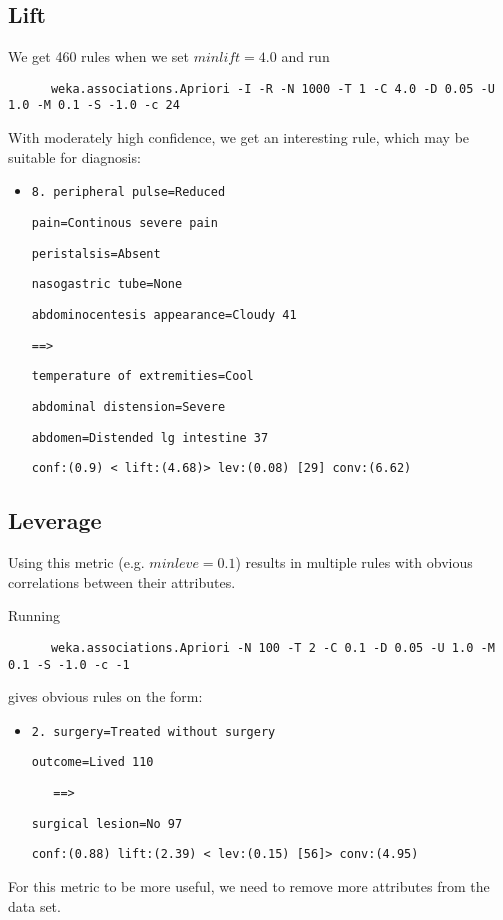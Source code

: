 \subsection{Lift}
We get 460 rules when we set $minlift = 4.0$ and run
\begin{verbatim}
	  weka.associations.Apriori -I -R -N 1000 -T 1 -C 4.0 -D 0.05 -U 1.0 -M 0.1 -S -1.0 -c 24
\end{verbatim}
With moderately high confidence, we get an interesting rule, which may be suitable for diagnosis:
\begin{itemize}
\item   \verb|8. peripheral pulse=Reduced|

\verb|pain=Continous severe pain| 

\verb|peristalsis=Absent| 

\verb|nasogastric tube=None| 

\verb|abdominocentesis appearance=Cloudy 41 |


\verb|==>| 


\verb|temperature of extremities=Cool| 

\verb|abdominal distension=Severe |

\verb|abdomen=Distended lg intestine 37 | 
  
\verb|conf:(0.9) < lift:(4.68)> lev:(0.08) [29] conv:(6.62)|

\end{itemize}



\subsection{Leverage} \label{sec: leve}
Using this metric (e.g. $minleve = 0.1$) results in multiple rules with obvious correlations between their attributes.

\noindent
Running
\begin{verbatim}
	  weka.associations.Apriori -N 100 -T 2 -C 0.1 -D 0.05 -U 1.0 -M 0.1 -S -1.0 -c -1
\end{verbatim} 

\noindent
gives obvious rules on the form:
\begin{itemize}
\item \verb|2. surgery=Treated without surgery| 

\verb|outcome=Lived 110|


\verb|   ==>|
 
\verb|surgical lesion=No 97|

\verb|conf:(0.88) lift:(2.39) < lev:(0.15) [56]> conv:(4.95)|
\end{itemize}
For this metric to be more useful, we need to remove more attributes from the data set.


